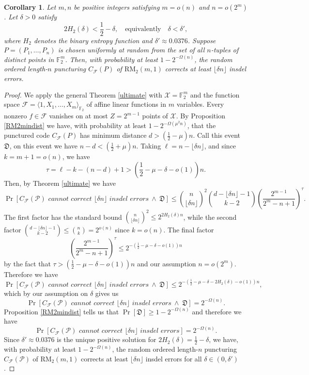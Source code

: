 \documentclass[draft, onecolumn, 11pt]{IEEEtran}
\newtheorem{corollary}[theorem]{Corollary}
\newcommand{\F}{\mathbb{F}}
\begin{document}
\begin{corollary}
Let $m,n$ be positive integers satisfying $m=o(n)$ and $n = o(2^m)$. Let $\delta>0$ satisfy
$$2H_2(\delta)<\frac{1}{2}-\delta, \quad \text{equivalently} \quad \delta < \delta',$$
where $H_2$ denotes the binary entropy function and $\delta' \approx 0.0376$. Suppose
$P=(P_1,\dots,P_n)$ is chosen uniformly at random from the set of all $n$-tuples of distinct points in $\F_2^m$. Then, with probability at least $1-2^{-\Omega(n)}$, the random ordered length-$n$ puncturing $C_{\mathcal{F}}(P)$ of $\mathrm{RM}_2(m,1)$ corrects at least $\lfloor\delta n\rfloor$ insdel errors.
\end{corollary}
\begin{proof}
    We apply the general Theorem \ref{ultimate} with $\mathcal{X} = \F_2^m$ and the function space $\mathcal{F} = \langle 1, X_1, \dots, X_m\rangle_{\F_2}$ of affine linear functions in $m$ variables. Every nonzero $f \in \mathcal{F}$ vanishes on at most $Z = 2^{m-1}$ points of $\mathcal{X}$. By Proposition \ref{RM2mindist} we have, with probability at least $1 - 2^{-\Omega(\mu^2n)}$, that the punctured code $C_{\mathcal{F}}(P)$ has minimum distance $d > \left( \frac{1}{2} - \mu\right)n$. Call this event $\mathfrak{D}$, on this event we have $n-d < \left( \frac{1}{2} + \mu\right)n$. Taking $\ell = n - \lfloor \delta n\rfloor$, and since $k = m + 1 = o(n)$, we have
    $$\tau = \ell - k - (n-d) + 1 > \left( \frac{1}{2} - \mu - \delta - o(1)\right)n.$$
    Then, by Theorem \ref{ultimate} we have 
    $$\Pr[C_{\mathcal{F}}(\mathcal{P}) \textit{ cannot correct $\lfloor \delta n\rfloor$ insdel errors} ~\wedge~\mathfrak{D}] \leq 
    \binom{n}{\lfloor \delta n\rfloor}^2 \binom{d - \lfloor \delta n\rfloor - 1}{k-2} \left(\frac{2^{m-1}}{2^m - n + 1}\right)^\tau.$$
    The first factor has the standard bound $\binom{n}{\lfloor \delta n\rfloor}^2  \leq 2^{2H_2(\delta)n}$, while the second factor $\binom{d - \lfloor \delta n\rfloor - 1}{k-2} \leq \binom{n}{k} = 2^{o(n)}$ since $k = o(n)$. The final factor 
    $$\left(\frac{2^{m-1}}{2^m - n + 1}\right)^\tau \leq 2^{-\left( \frac{1}{2} - \mu - \delta - o(1)\right)n}$$
    by the fact that $\tau > \left( \frac{1}{2} - \mu - \delta - o(1)\right)n$ and our assumption $n = o(2^m)$.
    Therefore we have 
    $$\Pr[C_{\mathcal{F}}(\mathcal{P}) \textit{ cannot correct $\lfloor \delta n\rfloor$ insdel errors} ~\wedge~\mathfrak{D}] \leq 2^{-\left( \frac{1}{2} - \mu - \delta - 2H_2(\delta) - o(1)\right)n},$$
    which by our assumption on $\delta$ gives us 
    $$\Pr[C_{\mathcal{F}}(\mathcal{P}) \textit{ cannot correct $\lfloor \delta n\rfloor$ insdel errors} ~\wedge~\mathfrak{D}] = 2^{-\Omega(n)}.$$
    Proposition \ref{RM2mindist} tells us that $\Pr[\mathfrak{D}] \geq 1 - 2^{-\Omega(n)}$ and therefore we have 
    $$\Pr[C_{\mathcal{F}}(\mathcal{P}) \textit{ cannot correct $\lfloor \delta n\rfloor$ insdel errors}] = 2^{-\Omega(n)}.$$
    Since $\delta' \approx 0.0376$ is the unique positive solution for $2H_2(\delta) = \frac{1}{2}-\delta$, we have, with probability at least $1-2^{-\Omega(n)}$, the random ordered length-$n$ puncturing $C_{\mathcal{F}}(\mathcal{P})$ of $\mathrm{RM}_2(m,1)$ corrects at least $\lfloor\delta n\rfloor$ insdel errors for all $\delta \in (0,\delta')$. 
\end{proof}
\end{document}
